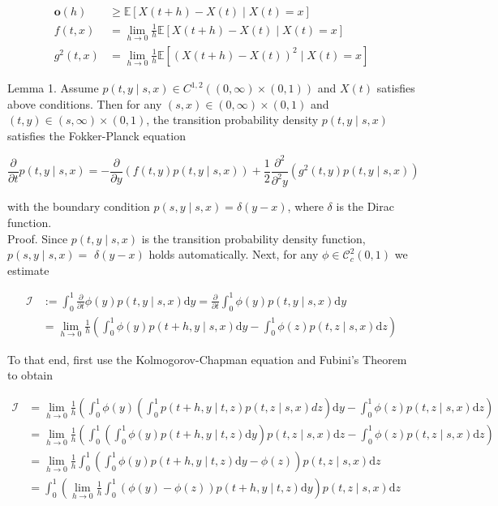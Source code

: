 \documentclass[10pt]{article}
\begin{document}
\begin{align*}
\mathbf{o}(h) & \geq \mathbb{E}[X(t+h)-X(t) \mid X(t)=x]  \tag{1}\\
f(t, x) & =\lim _{h \rightarrow 0} \frac{1}{h} \mathbb{E}[X(t+h)-X(t) \mid X(t)=x]  \tag{2}\\
g^{2}(t, x) & =\lim _{h \rightarrow 0} \frac{1}{h} \mathbb{E}\left[(X(t+h)-X(t))^{2} \mid X(t)=x\right] \tag{3}
\end{align*}


Lemma 1. Assume $p(t, y \mid s, x) \in C^{1,2}((0, \infty) \times(0,1))$ and $X(t)$ satisfies above conditions. Then for any $(s, x) \in(0, \infty) \times(0,1)$ and $(t, y) \in(s, \infty) \times(0,1)$, the transition probability density $p(t, y \mid s, x)$ satisfies the Fokker-Planck equation

$$
\frac{\partial}{\partial t} p(t, y \mid s, x)=-\frac{\partial}{\partial y}(f(t, y) p(t, y \mid s, x))+\frac{1}{2} \frac{\partial^{2}}{\partial^{2} y}\left(g^{2}(t, y) p(t, y \mid s, x)\right)
$$

with the boundary condition $p(s, y \mid s, x)=\delta(y-x)$, where $\delta$ is the Dirac function.\\
Proof. Since $p(t, y \mid s, x)$ is the transition probability density function, $p(s, y \mid s, x)=$ $\delta(y-x)$ holds automatically. Next, for any $\phi \in \mathscr{C}_{c}^{2}(0,1)$ we estimate

$$
\begin{aligned}
\mathscr{I} & :=\int_{0}^{1} \frac{\partial}{\partial t} \phi(y) p(t, y \mid s, x) \mathrm{d} y=\frac{\partial}{\partial t} \int_{0}^{1} \phi(y) p(t, y \mid s, x) \mathrm{d} y \\
& =\lim _{h \rightarrow 0} \frac{1}{h}\left(\int_{0}^{1} \phi(y) p(t+h, y \mid s, x) \mathrm{d} y-\int_{0}^{1} \phi(z) p(t, z \mid s, x) \mathrm{d} z\right)
\end{aligned}
$$

To that end, first use the Kolmogorov-Chapman equation and Fubini's Theorem to obtain


\begin{align*}
\mathscr{I} & =\lim _{h \rightarrow 0} \frac{1}{h}\left(\int_{0}^{1} \phi(y)\left(\int_{0}^{1} p(t+h, y \mid t, z) p(t, z \mid s, x) d z\right) \mathrm{d} y-\int_{0}^{1} \phi(z) p(t, z \mid s, x) \mathrm{d} z\right) \\
& =\lim _{h \rightarrow 0} \frac{1}{h}\left(\int_{0}^{1}\left(\int_{0}^{1} \phi(y) p(t+h, y \mid t, z) \mathrm{d} y\right) p(t, z \mid s, x) \mathrm{d} z-\int_{0}^{1} \phi(z) p(t, z \mid s, x) \mathrm{d} z\right) \\
& =\lim _{h \rightarrow 0} \frac{1}{h} \int_{0}^{1}\left(\int_{0}^{1} \phi(y) p(t+h, y \mid t, z) \mathrm{d} y-\phi(z)\right) p(t, z \mid s, x) \mathrm{d} z \\
& =\int_{0}^{1}\left(\lim _{h \rightarrow 0} \frac{1}{h} \int_{0}^{1}(\phi(y)-\phi(z)) p(t+h, y \mid t, z) \mathrm{d} y\right) p(t, z \mid s, x) \mathrm{d} z \tag{4}
\end{align*}
\end{document}
